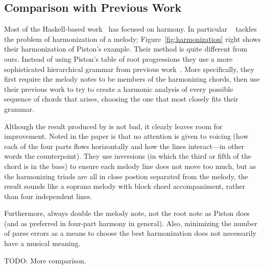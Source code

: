 \subsection{Comparison with Previous Work}
\label{sec:harmony:compare}

Most of the Haskell-based
work~\citep{magalhaes-harmtrace,koops-fharm,magalhaes-fcomp} has
focused on harmony. In particular \fharm~\citep{koops-fharm} tackles
the problem of harmonization of a melody;
Figure~\ref{fig:harmonization} right shows their harmonization of
Piston's example. Their method is quite different from
ours. Instead of using Piston's table of root progressions they use a
more sophisticated hierarchical grammar from previous
work~\citep{magalhaes-harmtrace}.
More specifically, they first require the melody notes to be members of
the harmonizing chords, then use their previous work to try to create
a harmonic analysis of every possible sequence of chords that arises,
choosing the one that most closely fits their grammar.

Although the result produced by \fharm is not bad, it clearly leaves
room for improvement. Noted in
the paper is that no attention is given to voicing (how each of the
four parts flows horizontally and how the lines interact---in other
words the counterpoint). They use inversions (in which the
third or fifth of the chord is in the bass) to ensure each melody line
does not move too much, but as the harmonizing triads are all in close
postion separated from the melody, the result sounds like a soprano
melody with block chord accompaniment, rather than four independent
lines.

Furthermore, \fharm always double the melody note, not the root note
as Piston does (and as preferred in four-part harmony in general).
Also, minimizing the number of parse errors as a means
to choose the best harmonization does not necessarily have a musical
meaning.

TODO: More comparison.
